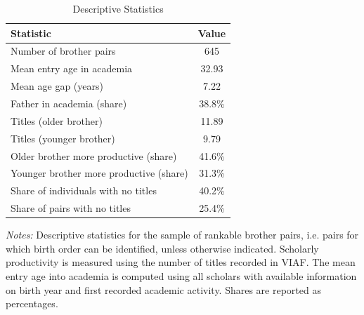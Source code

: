 \begin{table}[H]
\centering
\caption{Descriptive Statistics}
\label{tab:descriptives}

\begin{tablebody}
\begin{tabular}{l c}
\toprule
\textbf{Statistic} & \textbf{Value} \\
\midrule
Number of brother pairs & 645 \\
Mean entry age in academia & 32.93 \\
Mean age gap (years) & 7.22 \\
Father in academia (share) & 38.8\% \\
Titles (older brother) & 11.89 \\
Titles (younger brother) & 9.79 \\
Older brother more productive (share) & 41.6\% \\
Younger brother more productive (share) & 31.3\% \\
Share of individuals with no titles & 40.2\% \\
Share of pairs with no titles & 25.4\% \\
\bottomrule
\end{tabular}
\end{tablebody}

\vspace{4pt}
\begin{minipage}{\textwidth}
\footnotesize
\textit{Notes:} Descriptive statistics for the sample of rankable brother pairs, i.e. pairs for which birth order can be identified, unless otherwise indicated. Scholarly productivity is measured using the number of titles recorded in VIAF. The mean entry age into academia is computed using all scholars with available information on birth year and first recorded academic activity. Shares are reported as percentages.
\end{minipage}

\end{table}